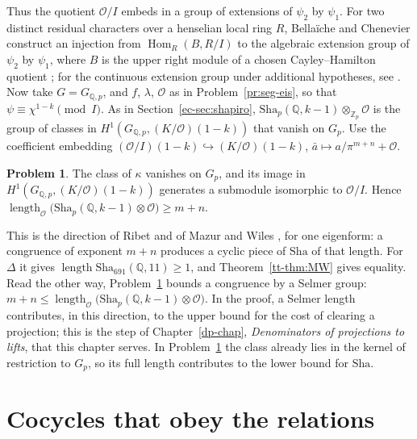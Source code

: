 \documentclass[reqno]{amsart}
\newcounter{chap}
\theoremstyle{definition}
\newtheorem{problem}{Problem}[section]
\theoremstyle{plain}
\newcommand{\Z}{\mathbb{Z}}
\newcommand{\Q}{\mathbb{Q}}
\newcommand{\Zp}{\Z_p}
\newcommand{\Oc}{\mathcal{O}}
\newcommand{\len}{\operatorname{length}}
\newcommand{\Sha}{\mathrm{Sha}}
\newcommand{\GQ}{G_{\Q,p}}
\begin{document}
Thus the quotient \(\Oc/I\) embeds in a group of extensions of \(\psi_2\) by \(\psi_1\).  For two distinct residual characters over a henselian local ring \(R\), Bellaïche and Chenevier construct an injection from \(\operatorname{Hom}_R(B,R/I)\) to the algebraic extension group of \(\psi_2\) by \(\psi_1\), where \(B\) is the upper right module of a chosen Cayley--Hamilton quotient \cite[Thm.~1.5.5]{BC}; for the continuous extension group under additional hypotheses, see \cite[Prop.~1.5.10(ii)]{BC}.  Now take \(G = \GQ\), and \(f\), \(\lambda\), \(\Oc\) as in Problem~\ref{pr:seg-eis}, so that \(\psi \equiv \chi^{1-k} \pmod I\).  As in Section~\ref{ec-sec:shapiro}, \(\Sha_p(\Q, k-1) \otimes_{\Zp} \Oc\) is the group of classes in \(H^1(\GQ, (K/\Oc)(1-k))\) that vanish on \(G_p\).  Use the coefficient embedding \((\Oc/I)(1-k)\hookrightarrow(K/\Oc)(1-k)\), \(\bar a\mapsto a/\pi^{m+n}+\Oc\).

\begin{problem}\label{pr:sha-lower}
The class of \(\kappa\) vanishes on \(G_p\), and its image in \(H^1(\GQ, (K/\Oc)(1-k))\) generates a submodule isomorphic to \(\Oc/I\).  Hence \(\len_\Oc\bigl(\Sha_p(\Q, k-1) \otimes \Oc\bigr) \ge m + n\).
\end{problem}

This is the direction of Ribet and of Mazur and Wiles \cite{MW}, for one eigenform: a congruence of exponent \(m + n\) produces a cyclic piece of \(\Sha\) of that length.  For \(\Delta\) it gives \(\len \Sha_{691}(\Q, 11) \ge 1\), and Theorem~\ref{tt-thm:MW} gives equality.  Read the other way, Problem~\ref{pr:sha-lower} bounds a congruence by a Selmer group: \(m + n \le \len_\Oc\bigl(\Sha_p(\Q, k-1) \otimes \Oc\bigr)\).  In the proof, a Selmer length contributes, in this direction, to the upper bound for the cost of clearing a projection; this is the step of Chapter~\ref{dp-chap}, \emph{Denominators of projections to lifts}, that this chapter serves.  In Problem~\ref{pr:sha-lower} the class already lies in the kernel of restriction to \(G_p\), so its full length contributes to the lower bound for \(\Sha\).

\section{Cocycles that obey the relations}\label{sec:relations}
\end{document}
